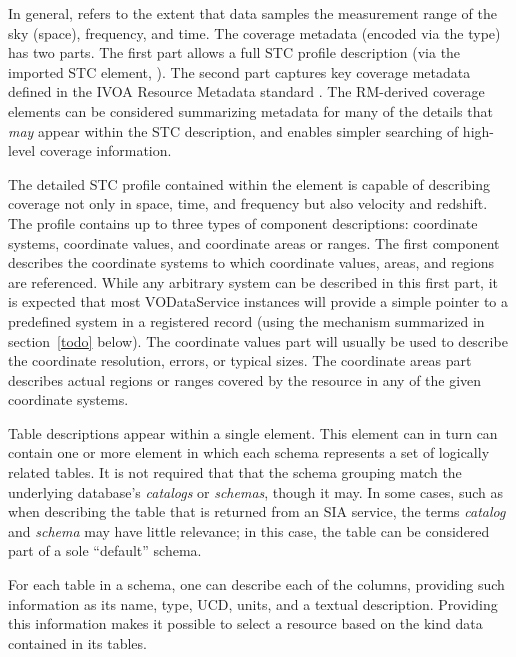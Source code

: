 \documentclass[11pt,a4paper]{ivoa}
\begin{document}
In general,  refers to
the extent that data samples the measurement range of the sky (space),
frequency, and time.  The coverage metadata (encoded via the
 type) has two parts.  The first part
allows a full STC profile description (via the imported STC element,
).  The second part
captures key coverage metadata defined in the IVOA Resource Metadata
standard \citep{2007ivoa.spec.0302H}.  The RM-derived coverage elements can
be considered summarizing metadata for many of the details that
\emph{may} appear within the STC description, and enables simpler
searching of high-level coverage information.



The detailed STC profile contained within the
 element is capable of
describing coverage not only in space, time, and frequency but also
velocity and redshift.  The profile contains up to three types of
component descriptions:
coordinate systems, coordinate values, and coordinate areas or ranges.
The first component describes the coordinate systems to which coordinate
values, areas, and regions are referenced.  While any arbitrary
system can be described in this first part, it is expected that most
VODataService instances will provide a simple pointer to a predefined
system in a registered  record (using the
mechanism summarized in section~\ref{todo} below).  The coordinate values
part will usually be used to describe the coordinate resolution,
errors, or typical sizes.  The coordinate areas part describes actual
regions or ranges covered by the resource in any of the given
coordinate systems.  


Table descriptions appear within a single 
element.  This element can in turn can contain one or more
 element in which each schema
represents a set of logically related tables.  It is not required that 
that the schema grouping match the underlying database's
\emph{catalogs} or \emph{schemas}, though it may.  In some cases,
such as when describing the table that is returned from an SIA
service, the terms \emph{catalog} and \emph{schema} may have
little relevance; in this case, the table can be considered part of a
sole ``default'' schema.  



For each table in a schema, one can describe each of the columns,
providing such information as its name, type, UCD,
units, and a textual description.  Providing this information makes it
possible to select a resource based on the kind data contained in its
tables.  
\end{document}
